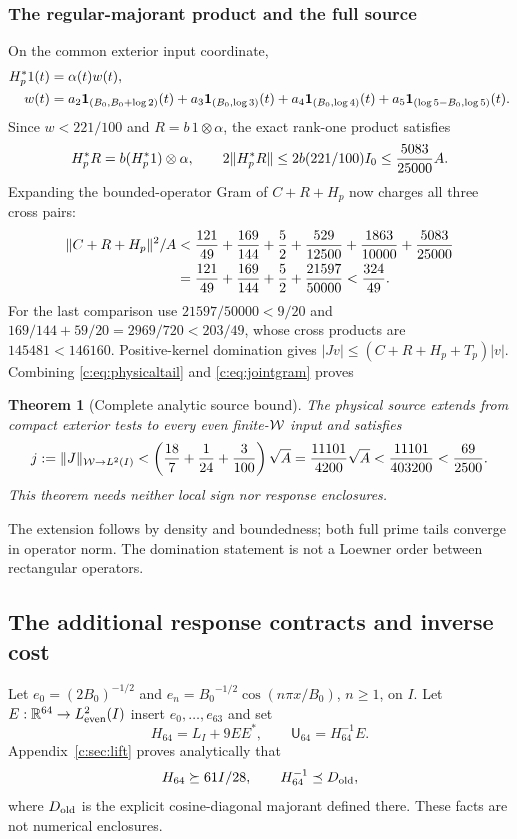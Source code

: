 \documentclass[11pt,a4paper]{article}
\numberwithin{equation}{section}
\newtheorem{theorem}{Theorem}[section]
\theoremstyle{definition}\newtheorem{definition}[theorem]{Definition}
\theoremstyle{remark}\newtheorem{remark}[theorem]{Remark}
\newcommand{\R}{\mathbb R}\newcommand{\C}{\mathbb C}\newcommand{\N}{\mathbb N}
\begin{document}
\subsubsection{The regular-majorant product and the full source}
On the common exterior input coordinate,
\begin{align*}
 H_p^*1(t)&=\alpha(t)w(t),\\
 w(t)&=a_2\mathbf1_{({B_0},{B_0}+\log2)}(t)+a_3\mathbf1_{({B_0},\log3)}(t)
 +a_4\mathbf1_{({B_0},\log4)}(t)+a_5\mathbf1_{(\log5-{B_0},\log5)}(t).
\end{align*}
Since $w<221/100$ and $R=b\,1\otimes\alpha$, the exact rank-one product satisfies
\begin{equation}\label{c:eq:HpR}
 H_p^*R=b(H_p^*1)\otimes\alpha,\qquad
 2\lVert H_p^*R\rVert\le2b(221/100)I_0\le\frac{5083}{25000}A.
\end{equation}
Expanding the bounded-operator Gram of $C+R+H_p$ now charges all three cross pairs:
\begin{align}
 \lVert C+R+H_p\rVert^2/A
 &<\frac{121}{49}+\frac{169}{144}+\frac52+
   \frac{529}{12500}+\frac{1863}{10000}+\frac{5083}{25000}\notag\\
 &=\frac{121}{49}+\frac{169}{144}+\frac52+\frac{21597}{50000}
 <\frac{324}{49}.\label{c:eq:jointgram}
\end{align}
For the last comparison use $21597/50000<9/20$ and
$169/144+59/20=2969/720<203/49$, whose cross products are
$145481<146160$.
Positive-kernel domination gives
$|Jv|\le(C+R+H_p+T_p)|v|$.
Combining \eqref{c:eq:physicaltail} and \eqref{c:eq:jointgram} proves
\begin{theorem}[Complete analytic source bound]\label{c:thm:source}
The physical source extends from compact exterior tests to every even finite-$\mathcal W$ input and satisfies
\begin{equation}\label{c:eq:sourcej}
 j:=\lVert J\rVert_{\mathcal W\to L^2(I)}
 <\left(\frac{18}{7}+\frac1{24}+\frac3{100}\right)\sqrt A
 =\frac{11101}{4200}\sqrt A<\frac{11101}{403200}<\frac{69}{2500}.
\end{equation}
This theorem needs neither local sign nor response enclosures.
\end{theorem}
The extension follows by density and boundedness; both full prime tails converge in operator norm. The domination statement is not a Loewner order between rectangular operators.

\subsection{The additional response contracts and inverse cost}\label{c:sec:response}
Let $e_0=(2{B_0})^{-1/2}$ and
$e_n={B_0}^{-1/2}\cos(n\pi x/{B_0})$, $n\ge1$, on $I$.
Let $E:\R^{64}\to L^2_{\rm even}(I)$ insert $e_0,\ldots,e_{63}$ and set
\[
 H_{64}=L_I+9EE^*,\qquad \mathsf U_{64}=H_{64}^{-1}E.
\]
Appendix~\ref{c:sec:lift} proves analytically that
\begin{equation}\label{c:eq:Hcoercivity}
 H_{64}\succeq61I/28,\qquad H_{64}^{-1}\preceq D_{\rm old},
\end{equation}
where $D_{\rm old}$ is the explicit cosine-diagonal majorant defined there.
These facts are not numerical enclosures.
\end{document}

